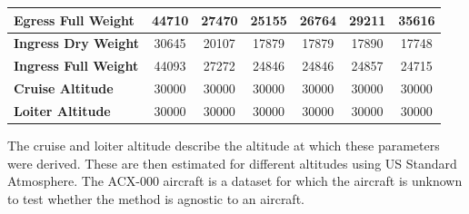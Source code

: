 \begin{table}[H]
{\begin{tabular}{|l|c|c|c|c|c|c|}
\textbf{Egress Full Weight}  & 44710          & 27470          & 25155            & 26764            & 29211            & 35616            \\ \hline
\textbf{Ingress Dry Weight}  & 30645          & 20107          & 17879            & 17879            & 17890            & 17748            \\ \hline
\textbf{Ingress Full Weight} & 44093          & 27272          & 24846            & 24846            & 24857            & 24715            \\ \hline
\textbf{Cruise Altitude}     & 30000          & 30000          & 30000            & 30000            & 30000            & 30000            \\ \hline
\textbf{Loiter Altitude}     & 30000          & 30000          & 30000            & 30000            & 30000            & 30000            \\ \hline
\end{tabular}
}
\end{table}
The cruise and loiter altitude describe the altitude at which these parameters were derived. These are then estimated for different altitudes using US Standard Atmosphere. The ACX-000 aircraft is a dataset for which the aircraft is unknown to test whether the method is agnostic to an aircraft.


